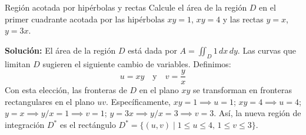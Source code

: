 \documentclass[11pt,a4paper]{article}
\begin{document}
\begin{ejerciciobox}{Región acotada por hipérbolas y rectas}
Calcule el área de la región $D$ en el primer cuadrante acotada por las hipérbolas $xy = 1$, $xy = 4$ y las rectas $y = x$, $y = 3x$.

\textbf{Solución:}
El área de la región $D$ está dada por $A = \iint_D 1 \, dx \, dy$. Las curvas que limitan $D$ sugieren el siguiente cambio de variables. Definimos:
\begin{equation*}
u = xy \quad \text{y} \quad v = \frac{y}{x}
\end{equation*}
Con esta elección, las fronteras de $D$ en el plano $xy$ se transforman en fronteras rectangulares en el plano $uv$.
Específicamente, $xy=1 \implies u=1$; $xy=4 \implies u=4$; $y=x \implies y/x=1 \implies v=1$; $y=3x \implies y/x=3 \implies v=3$.
Así, la nueva región de integración $D^*$ es el rectángulo $D^* = \{(u,v) \mid 1 \le u \le 4, \, 1 \le v \le 3\}$.


\end{ejerciciobox}
\end{document}
